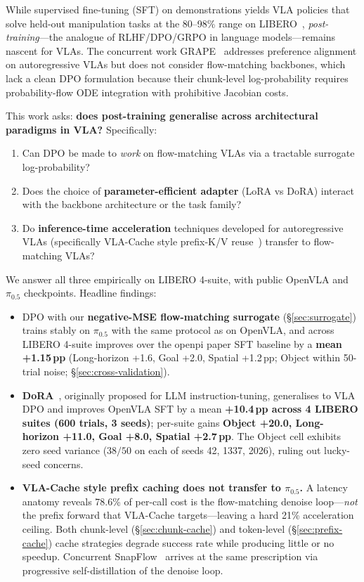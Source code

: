 \documentclass{article}
\begin{document}
While supervised fine-tuning (SFT) on demonstrations yields VLA policies that solve held-out manipulation tasks at the 80--98\% range on LIBERO~\cite{liu2023libero}, \emph{post-training}---the analogue of RLHF/DPO/GRPO in language models---remains nascent for VLAs. The concurrent work GRAPE~\cite{grape2024} addresses preference alignment on autoregressive VLAs but does not consider flow-matching backbones, which lack a clean DPO formulation because their chunk-level log-probability requires probability-flow ODE integration with prohibitive Jacobian costs.

This work asks: \textbf{does post-training generalise across architectural paradigms in VLA?} Specifically:

\begin{enumerate}
  \item Can DPO be made to \emph{work} on flow-matching VLAs via a tractable surrogate log-probability?
  \item Does the choice of \textbf{parameter-efficient adapter} (LoRA vs DoRA) interact with the backbone architecture or the task family?
  \item Do \textbf{inference-time acceleration} techniques developed for autoregressive VLAs (specifically VLA-Cache style prefix-K/V reuse~\cite{wang2025vlacache}) transfer to flow-matching VLAs?
\end{enumerate}

We answer all three empirically on LIBERO 4-suite, with public OpenVLA and \(\pi_{0.5}\) checkpoints. Headline findings:

\begin{itemize}
  \item DPO with our \textbf{negative-MSE flow-matching surrogate} (\S\ref{sec:surrogate}) trains stably on \(\pi_{0.5}\) with the same protocol as on OpenVLA, and across LIBERO 4-suite improves over the openpi paper SFT baseline by a \textbf{mean +1.15\,pp} (Long-horizon +1.6, Goal +2.0, Spatial +1.2\,pp; Object within 50-trial noise; \S\ref{sec:cross-validation}).
  \item \textbf{DoRA}~\cite{liu2024dora}, originally proposed for LLM instruction-tuning, generalises to VLA DPO and improves OpenVLA SFT by a mean \textbf{+10.4\,pp across 4 LIBERO suites (600 trials, 3 seeds)}; per-suite gains \textbf{Object +20.0, Long-horizon +11.0, Goal +8.0, Spatial +2.7\,pp}. The Object cell exhibits zero seed variance (\(38{/}50\) on each of seeds 42, 1337, 2026), ruling out lucky-seed concerns.
  \item \textbf{VLA-Cache style prefix caching does not transfer to \(\pi_{0.5}\).} A latency anatomy reveals 78.6\% of per-call cost is the flow-matching denoise loop---\emph{not} the prefix forward that VLA-Cache targets---leaving a hard 21\% acceleration ceiling. Both chunk-level (\S\ref{sec:chunk-cache}) and token-level (\S\ref{sec:prefix-cache}) cache strategies degrade success rate while producing little or no speedup. Concurrent SnapFlow~\cite{snapflow2026} arrives at the same prescription via progressive self-distillation of the denoise loop.
\end{itemize}
\end{document}
